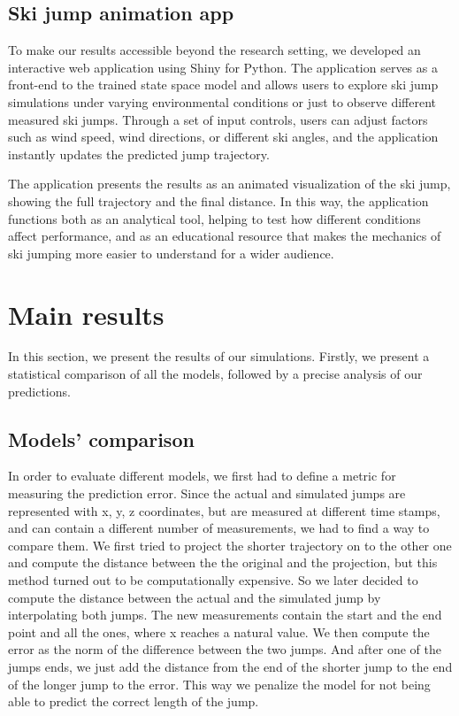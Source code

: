 \documentclass[sigconf,natbib=false, language=english]{acmart}
\begin{document}
\subsection{Ski jump animation app}

To make our results accessible beyond the research setting, we developed an 
interactive web application using Shiny for Python. The application serves as a 
front-end to the trained state space model and allows users to explore ski jump 
simulations under varying environmental conditions or just to observe different 
measured ski jumps. Through a set of input controls, users can adjust factors such 
as wind speed, wind directions, or different ski angles, and the application instantly 
updates the predicted jump trajectory.

The application presents the results as an animated visualization of the ski jump, 
showing the full trajectory and the final distance. In this way, the application 
functions both as an analytical tool, helping to test how different conditions affect 
performance, and as an educational resource that makes the mechanics of ski jumping 
more easier to understand for a wider audience.

\section{Main results}\label{sec:results}
In this section, we present the results of our simulations. Firstly, we present a 
statistical comparison of all the models, followed by a precise analysis of our 
predictions.


\subsection{Models' comparison}

In order to evaluate different models, we first had to define a metric for measuring the prediction error.
Since the actual and simulated jumps are represented with x, y, z coordinates, but are measured at different time stamps,
and can contain a different number of measurements, we had to find a way to compare them. We first tried to project
the shorter trajectory on to the other one and compute the distance between the the original and the projection, 
but this method turned out to be computationally expensive. So we later decided to compute the distance between 
the actual and the simulated jump by interpolating both jumps. The new measurements contain the start and the end point
and all the ones, where x reaches a natural value. We then compute the error as the norm of the difference between the two jumps.
And after one of the jumps ends, we just add the distance from the end of the shorter jump to the end of the longer jump
to the error. This way we penalize the model for not being able to predict the correct length of the jump.
\end{document}
